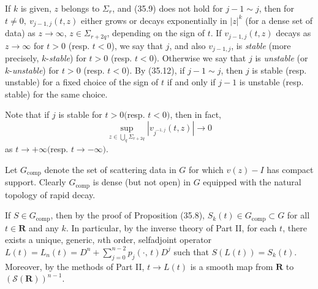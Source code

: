 \documentclass{surv-l}
\theoremstyle{plain}
\theoremstyle{definition}
\numberwithin{equation}{chapter}
\begin{document}
If $k$ is given, $z$ belongs to $\Sigma_{r}$, and (35.9) does not hold for $j-1\sim j$, then for $t\neq 0,\ v_{j-1,j}(t, z)$ either grows or decays exponentially in $|z|^{k}$ (for a dense set of data) as $z\rightarrow\infty,\, z\in\Sigma_{r+2q}$, depending on the sign of $t$. If $v_{j-1,j}(t, z)$ decays as $ z\rightarrow\infty$ for $t>0$ (resp. $t<0$), we say that $j$, and also $v_{j-1,j}$, is \emph{stable} (more precisely, $k$-\emph{stable}) for $t>0$ (resp. $t<0$). Otherwise we say that $j$ is \emph{unstable} (or $k$-\emph{unstable}) for $t>0$ (resp. $t<0$). By (35.12), if $j-1\sim j$, then $j$ is stable (resp. unstable) for a fixed choice of the sign of $t$ if and only if $j-1$ is unstable (resp. stable) for the same choice.

Note that if $j$ is stable for $t>0 ($resp. $t<0)$, then in fact,
\setcounter{equation}{17}
\begin{equation}\label{eq35.18}
\sup_{z\in\bigcup_{q}\Sigma_{r+2q}}|v_{j^{-1,j}}(t,z)|\rightarrow 0
\end{equation}
as $ t\rightarrow+\infty ($resp. $t\rightarrow-\infty)$.

Let $G_{\mathrm{comp}}$ denote the set of scattering data in $G$ for which $v(z)-I$ has compact support. Clearly $G_{\mathrm{comp}}$ is dense (but not open) in $G$ equipped with the natural topology of rapid decay.

If $S\in G_{\mathrm{comp}}$, then by the proof of Proposition (35.8), $S_{k}(t)\in G_{\mathrm{comp}}\subset G$ for all $t\in \mathbf{R}$ and any $k$. In particular, by the inverse theory of Part II, for each $t$, there exists a unique, generic, $n$th order, selfadjoint operator $L(t)=L_{n}(t)= D^{n}+\sum_{j=0}^{n-2}p_{j}(\cdot,\, t)D^{j}$ such that $S(L(t))=S_{k}(t)$. Moreover, by the methods of Part II, $t\rightarrow L(t)$ is a smooth map from $\mathbf{R}$ to $(\mathscr{S}(\mathbf{R}))^{n-1}$.
\end{document}
